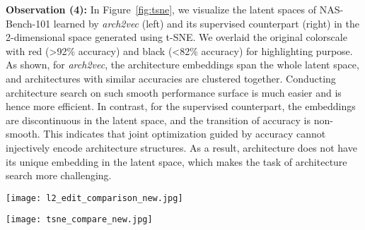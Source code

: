 \textbf{Observation (4):} 
In Figure~\ref{fig:tsne}, we visualize the latent spaces of NAS-Bench-101 learned by \textit{arch2vec} (left) and its supervised counterpart (right) in the 2-dimensional space generated using t-SNE. We overlaid the original colorscale with red (>92\% accuracy) and black (<82\% accuracy) for highlighting purpose.
As shown, for \textit{arch2vec}, the architecture embeddings span the whole latent space, and architectures with similar accuracies are clustered together. 
Conducting architecture search on such smooth performance surface is much easier and is hence more efficient. 
In contrast, for the supervised counterpart, the embeddings are discontinuous in the latent space, and the transition of accuracy is non-smooth. This indicates that joint optimization guided by accuracy cannot injectively encode architecture structures. As a result, architecture does not have its unique embedding in the latent space, which makes the task of architecture search more challenging.

\begin{figure*}[t]
    \centering
    \begin{minipage}[ht]{0.45\textwidth}
    \vspace{3.5mm}
    \texttt{[image: l2\_edit\_comparison\_new.jpg]}
    \caption{Comparing distribution of L2 distance between architecture pairs by edit distance on NAS-Bench-101, measured by 1,000 architectures sampled in a long random walk with 1 edit distance apart from consecutive samples. left: \textit{arch2vec}. right: supervised architecture representation learning.}
\label{fig:l2_edit_correlation}
    \end{minipage}
    \hspace{0.1cm}
    \begin{minipage}[ht]{0.5\textwidth}
    \centering
    \texttt{[image: tsne\_compare\_new.jpg]}
    \caption{Latent space 2D visualization \cite{vanDerMaaten2008} comparison between \textit{arch2vec} (left) and supervised architecture representation learning (right) on NAS-Bench-101. Color encodes test accuracy. We randomly sample $10,000$ points and average the accuracy in each small area.}
    \label{fig:tsne}
    \end{minipage}
    \vspace{-4mm}
\end{figure*}

